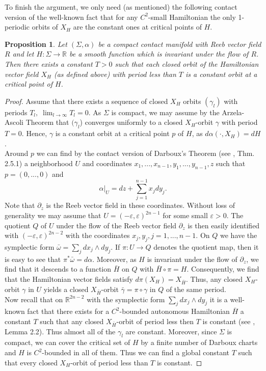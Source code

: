 \documentclass[a4paper,12pt,bibliography=totocnumbered,titlepage=false,abstracton,bookmarksnumbered=true]{scrartcl}
\newcommand{\veps}{\varepsilon}
\newtheorem{prop}[defn]{Proposition}
\theoremstyle{definition}
\begin{document}
To finish the argument, we only need (as mentioned) the following contact version of the well-known fact that for any $C^2$-small Hamiltonian the only 1-periodic orbits of $X_H$ are the constant ones at critical points of $H$.
\begin{prop}\label{smallHamilt}
 Let $(\Sigma,\alpha)$ be a compact contact manifold with Reeb vector field $R$ and let $H:\Sigma\rightarrow\mathbb{R}$ be a smooth function which is invariant under the flow of $R$. Then there exists a constant $T>0$ such that each closed orbit of the Hamiltonian vector field $X_H$ (as defined above) with period less than $T$ is a constant orbit at a critical point of $H$.
\end{prop}
\begin{proof}
 Assume that there exists a sequence of closed $X_H$ orbits $(\gamma_l)$ with periods $T_l, \; \lim_{l\rightarrow\infty} T_l =0$. As $\Sigma$ is compact, we may assume by the Arzela-Ascoli Theorem that $(\gamma_l$) converges uniformly to a closed $X_H$-orbit $\gamma$ with period $T=0$. Hence, $\gamma$ is a constant orbit at a critical point $p$ of $H$, as $d\alpha(\cdot, X_H)=dH$.\\
 Around $p$ we can find by the contact version of Darboux's Theorem (see \cite{Geiges}, Thm. 2.5.1) a neighborhood $U$ and coordinates $x_1,...,x_{n-1},y_1,...,y_{n-1},z$ such that $p=(0,...,0)$ and
 \[\alpha|_U = dz+\sum_{j=1}^{n-1} x_jdy_j.\]
 Note that $\partial_z$ is the Reeb vector field in these coordinates. Without loss of generality we may assume that $U=(-\veps,\veps)^{2n-1}$ for some small $\veps>0$. The quotient $Q$ of $U$ under the flow of the Reeb vector field $\partial_z$ is then easily identified with $(-\veps,\veps)^{2n-2}$ with the coordinates $x_j,y_j, j=1,...,n{-}1$. On $Q$ we have the symplectic form $\bar{\omega}=\sum_j dx_j{\wedge} dy_j$. If $\pi:U\rightarrow Q$ denotes the quotient map, then it is easy to see that $\pi^\ast \bar{\omega}=d\alpha$. Moreover, as $H$ is invariant under the flow of $\partial_z$, we find that it descends to a function $\bar{H}$ on $Q$ with $\bar{H}\circ \pi= H$. Consequently, we find that the Hamiltonian vector fields satisfy $d\pi(X_H)=X_{\bar{H}}$. Thus, any closed $X_H$-orbit $\gamma$ in $U$ yields a closed $X_{\bar{H}}$-orbit $\bar{\gamma}=\pi\circ \gamma$ in $Q$ of the same period.\\
 Now recall that on $\mathbb{R}^{2n-2}$ with the symplectic form $\sum_j dx_j{\wedge} dy_j$ it is a well-known fact that there exists for a $C^2$-bounded autonomous Hamiltonian $\bar{H}$ a constant $T$ such that any closed $X_{\bar{H}}$-orbit of period less then $T$ is constant (see \cite{Laud}, Lemma 2.2). Thus almost all of the $\gamma_l$ are constant. Moreover, since $\Sigma$ is compact, we can cover the critical set of $H$ by a finite number of Darboux charts and $H$ is $C^2$-bounded in all of them. Thus we can find a global constant $T$ such that every closed $X_H$-orbit of period less than $T$ is constant.
\end{proof}



\end{document}
